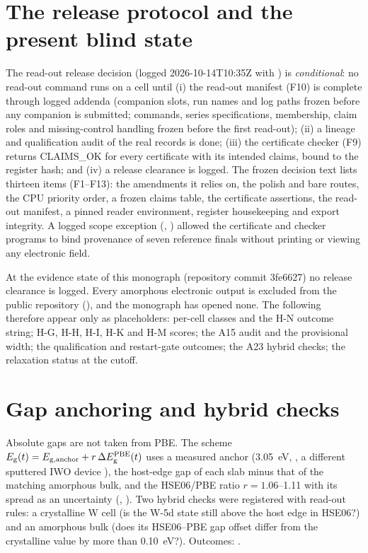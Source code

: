 \section{The release protocol and the present blind state}
\label{sec:mono-am-release}

The read-out release decision  (logged 2026-10-14T10:35Z with ) is \emph{conditional}: no read-out
command runs on a cell until (i) the read-out manifest (F10) is complete through logged addenda (companion slots, run
names and log paths frozen before any companion is submitted; commands, series specifications, membership, claim roles
and missing-control handling frozen before the first read-out); (ii) a lineage and qualification audit of the real
records is done; (iii) the certificate checker (F9) returns CLAIMS\_OK for every certificate with its intended claims,
bound to the register hash; and (iv) a release clearance is logged. The frozen decision text lists thirteen items
(F1--F13): the amendments it relies on, the polish and bare routes, the CPU priority order, a frozen claims table, the
certificate assertions, the read-out manifest, a pinned reader environment, register housekeeping and export integrity.
A logged scope exception (, ) allowed the certificate and checker programs to bind provenance of
seven reference finals without printing or viewing any electronic field.

At the evidence state of this monograph (repository commit 3fe6627) no release clearance is logged. Every amorphous
electronic output is excluded from the public repository (), and the
monograph has opened none. The following therefore appear only as placeholders: per-cell classes and the H-N outcome
string; H-G, H-H, H-I, H-K and H-M scores; the A15 audit and the provisional width; the qualification and restart-gate
outcomes; the A23 hybrid checks; the relaxation status at the cutoff.

\section{Gap anchoring and hybrid checks}
\label{sec:mono-am-gap}

Absolute gaps are not taken from PBE. The scheme $E_{\mathrm{g}}(t) = E_{\mathrm{g,anchor}} + r\,\Delta E_{\mathrm{g}}^{\mathrm{PBE}}(t)$ uses a measured
anchor (3.05~eV, , a different sputtered IWO device \citep{Fan2021}), the host-edge gap of each slab
minus that of the matching amorphous bulk, and the HSE06/PBE ratio $r = 1.06$--1.11 with its spread as an uncertainty
(, ). Two hybrid checks were registered with read-out rules: a crystalline W cell (is the W-5d state
still above the host edge in HSE06?) and an amorphous bulk (does its HSE06--PBE gap offset differ from the crystalline
value by more than 0.10~eV?). Outcomes: .

